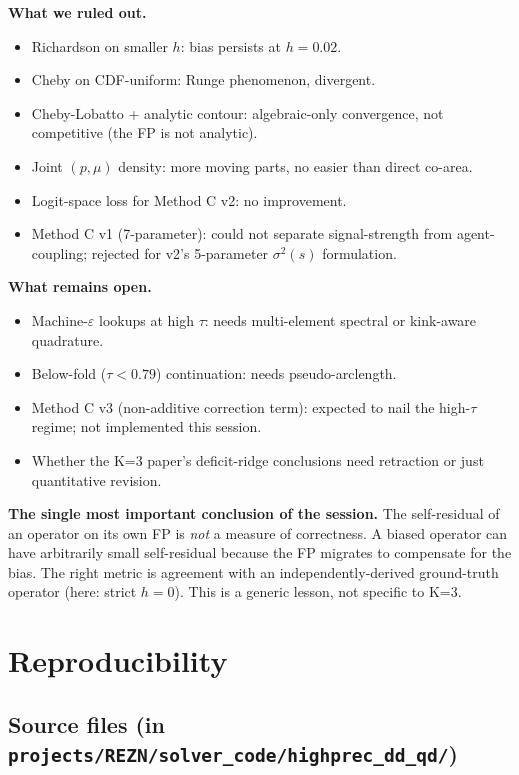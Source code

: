 \documentclass[11pt]{article}
\begin{document}
\textbf{What we ruled out.}
\begin{itemize}\itemsep1pt
  \item Richardson on smaller $h$: bias persists at $h = 0.02$.
  \item Cheby on CDF-uniform: Runge phenomenon, divergent.
  \item Cheby-Lobatto + analytic contour: algebraic-only convergence,
        not competitive (the FP is not analytic).
  \item Joint $(p, \mu)$ density: more moving parts, no easier than
        direct co-area.
  \item Logit-space loss for Method C v2: no improvement.
  \item Method C v1 (7-parameter): could not separate signal-strength
        from agent-coupling; rejected for v2's 5-parameter
        $\sigma^2(s)$ formulation.
\end{itemize}

\textbf{What remains open.}
\begin{itemize}\itemsep1pt
  \item Machine-$\varepsilon$ lookups at high $\tau$: needs multi-element
        spectral or kink-aware quadrature.
  \item Below-fold ($\tau < 0.79$) continuation: needs pseudo-arclength.
  \item Method C v3 (non-additive correction term): expected to nail
        the high-$\tau$ regime; not implemented this session.
  \item Whether the K=3 paper's deficit-ridge conclusions need
        retraction or just quantitative revision.
\end{itemize}

\textbf{The single most important conclusion of the session.} The
self-residual of an operator on its own FP is \emph{not} a measure of
correctness. A biased operator can have arbitrarily small self-residual
because the FP migrates to compensate for the bias. The right metric is
agreement with an independently-derived ground-truth operator (here:
strict $h = 0$). This is a generic lesson, not specific to K=3.

\section{Reproducibility}

\subsection{Source files (in \texttt{projects/REZN/solver\_code/highprec\_dd\_qd/})}
\end{document}
